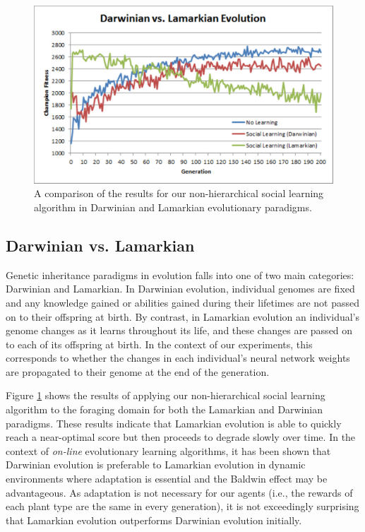 \documentclass{acm_proc_article-sp}
\begin{document}
\begin{figure}
  \centering
    \includegraphics[scale=.35]{darwin_lamark.pdf}
  \caption{A comparison of the results for our non-hierarchical social learning algorithm in Darwinian and Lamarkian evolutionary paradigms.}
  \label{fig:darwin-lamark}
\end{figure}

\subsection*{Darwinian vs. Lamarkian}
Genetic inheritance paradigms in evolution falls into one of two main categories: Darwinian and Lamarkian. In Darwinian evolution, individual genomes are fixed and any knowledge gained or abilities gained during their lifetimes are not passed on to their offspring at birth. By contrast, in Lamarkian evolution an individual's genome changes as it learns throughout its life, and these changes are passed on to each of its offspring at birth. In the context of our experiments, this corresponds to whether the changes in each individual's neural network weights are propagated to their genome at the end of the generation.

Figure \ref{fig:darwin-lamark} shows the results of applying our non-hierarchical social learning algorithm to the foraging domain for both the Lamarkian and Darwinian paradigms. These results indicate that Lamarkian evolution is able to quickly reach a near-optimal score but then proceeds to degrade slowly over time. In the context of \textit{on-line} evolutionary learning algorithms, it has been shown \cite{whiteson2006evolutionary} that Darwinian evolution is preferable to Lamarkian evolution in dynamic environments where adaptation is essential and the Baldwin effect \cite{simpson1953baldwin} may be advantageous. As adaptation is not necessary for our agents (i.e., the rewards of each plant type are the same in every generation), it is not exceedingly surprising that Lamarkian evolution outperforms Darwinian evolution initially.
\end{document}
